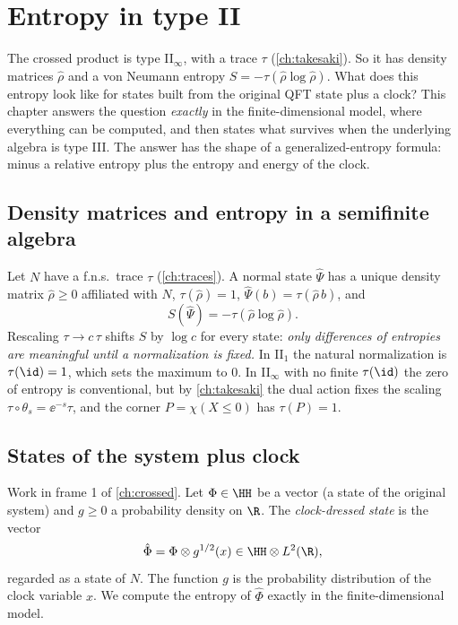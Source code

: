 \chapter{Entropy in type II}\label{ch:entropy_II}

\begin{physmotiv}
The crossed product is type II$_\infty$, with a trace $\tau$ (\cref{ch:takesaki}). So it has density matrices $\hat\rho$ and a von Neumann entropy $S=-\tau(\hat\rho\log\hat\rho)$. What does this entropy look like for states built from the original QFT state plus a clock? This chapter answers the question \emph{exactly} in the finite-dimensional model, where everything can be computed, and then states what survives when the underlying algebra is type III. The answer has the shape of a generalized-entropy formula: minus a relative entropy plus the entropy and energy of the clock.
\end{physmotiv}

\section{Density matrices and entropy in a semifinite algebra}

Let $N$ have a f.n.s.\ trace $\tau$ (\cref{ch:traces}). A normal state $\hat\Psi$ has a unique density matrix $\hat\rho\ge0$ affiliated with $N$, $\tau(\hat\rho)=1$, $\hat\Psi(b)=\tau(\hat\rho\,b)$, and
\begin{equation}
S(\hat\Psi)=-\tau(\hat\rho\log\hat\rho).
\end{equation}
Rescaling $\tau\to c\,\tau$ shifts $S$ by $\log c$ for every state: \emph{only differences of entropies are meaningful until a normalization is fixed.} In II$_1$ the natural normalization is $\tau(\id)=1$, which sets the maximum to $0$. In II$_\infty$ with no finite $\tau(\id)$ the zero of entropy is conventional, but by \cref{ch:takesaki} the dual action fixes the scaling $\tau\circ\theta_s=\ee^{-s}\tau$, and the corner $P=\chi(X\le0)$ has $\tau(P)=1$.

\section{States of the system plus clock}

Work in frame 1 of \cref{ch:crossed}. Let $\Phi\in\HH$ be a vector (a state of the original system) and $g\ge0$ a probability density on $\R$. The \emph{clock-dressed state} is the vector
\begin{equation}
\hat\Phi=\Phi\otimes g^{1/2}(x)\in\HH\otimes L^2(\R),
\end{equation}
regarded as a state of $N$. The function $g$ is the probability distribution of the clock variable $x$. We compute the entropy of $\hat\Phi$ exactly in the finite-dimensional model.

